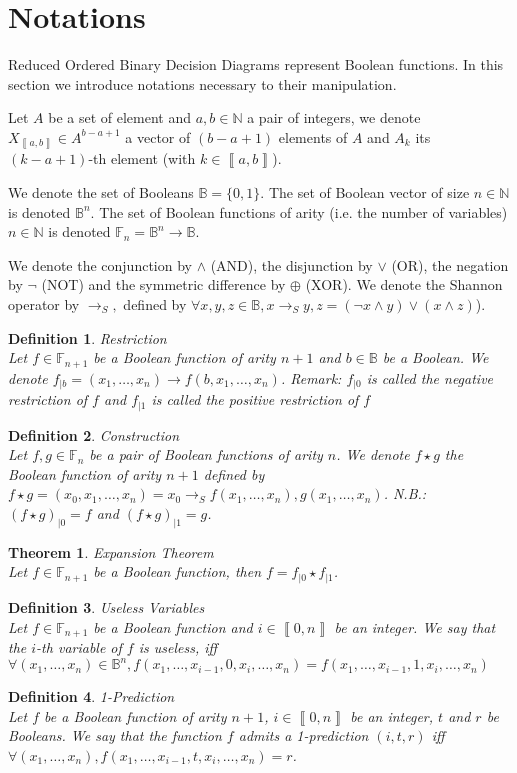 \documentclass[a4paper,10pt]{article}
\newcommand{\shannon}[3]{{#1}\longrightarrow_S{#2}, {#3}}
\newcommand{\N}{\mathbb{N}}%
\newcommand{\B}{\mathbb{B}}
\newcommand{\F}{\mathbb{F}}
\newcommand{\bras}[1]{{\left\llbracket{#1}\right\rrbracket}}
\newcommand\restr[2]{{#1}_{\left|{#2}\right.}}
\newtheorem{newtheo}{Theorem}
\newcommand{\theorem}[2]{\begin{newtheo}{\textsf{#1}\\} #2 \end{newtheo}}
\newtheorem{newdef}{Definition}
\newcommand{\definition}[2]{\begin{newdef}{#1\\}#2\end{newdef}}
\begin{document}
\section{Notations}

Reduced Ordered Binary Decision Diagrams represent Boolean functions.
In this section we introduce notations necessary to their manipulation.

Let $A$ be a set of element and $a, b\in\N$ a pair of integers, we denote $X_{\bras{a, b}}\in A^{b-a+1}$ a vector of $(b-a+1)$ elements of $A$ and $A_k$ its $(k-a+1)$-th element (with $k\in\bras{a, b}$).

We denote the set of Booleans $\B = \{0, 1\}$.
The set of Boolean vector of size $n\in\N$ is denoted $\B^n$.
The set of Boolean functions of arity (i.e. the number of variables) $n\in\N$ is denoted $\F_n = \B^n \longrightarrow \B$.


We denote the conjunction by $\land$ (AND), the disjunction by $\lor$ (OR), the negation by $\lnot$ (NOT) and the symmetric difference by $\oplus$ (XOR).
We denote the Shannon operator by $\shannon{}{}{}$ defined by $\forall x, y, z\in\B, \shannon{x}{y}{z} = (\lnot x \land y) \lor (x \land z)$).

\definition{Restriction}
{
	Let $f\in\F_{n+1}$ be a Boolean function of arity $n+1$ and $b\in\B$ be a Boolean.
	We denote $\restr{f}{b} = (x_1, \dots, x_n) \longrightarrow f(b, x_1, \dots, x_n)$.
	Remark: $\restr{f}{0}$ is called the negative restriction of $f$ and $\restr{f}{1}$ is called the positive restriction of $f$
}

\definition{Construction}
{
	Let $f, g\in\F_n$ be a pair of Boolean functions of arity $n$.
	We denote $f\star{}g$ the Boolean function of arity $n+1$ defined by $ f\star{}g = (x_0, x_1, \dots, x_n) = \shannon{x_0}{f(x_1, \dots, x_n)}{g(x_1, \dots, x_n)}$.
	N.B.: $\restr{(f\star g)}{0} = f$ and $ \restr{(f\star g)}{1} = g$.
}

\theorem{Expansion Theorem}{
Let $f\in\F_{n+1}$ be a Boolean function, then $f = \restr{f}{0} \star \restr{f}{1}$.
}

\definition{Useless Variables}
{
Let $f\in\F_{n+1}$ be a Boolean function and $i\in\bras{0, n}$ be an integer.
We say that the $i$-th variable of $f$ is useless, iff $\forall (x_1, \dots, x_n)\in\B^n, f(x_1, \dots, x_{i-1}, 0, x_i, \dots, x_n) = f(x_1, \dots, x_{i-1}, 1, x_i, \dots, x_n)$
}

\definition{1-Prediction}
{
Let $f$ be a Boolean function of arity $n+1$, $i\in\bras{0, n}$ be an integer, $t$ and $r$ be Booleans.
We say that the function $f$ admits a 1-prediction $(i, t, r)$ iff $\forall (x_1, \dots, x_n), f(x_1, \dots, x_{i-1}, t, x_i, \dots, x_n) = r$.
}
\end{document}
